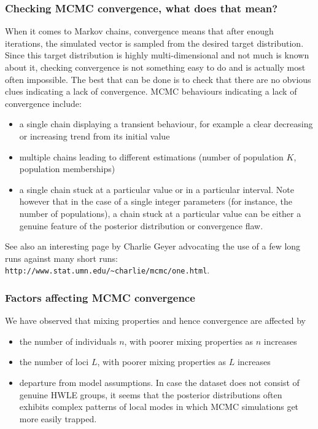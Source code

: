 \documentclass[a4paper,10pt]{article}
\begin{document}
\subsubsection{Checking MCMC convergence, what does that mean?}

When it comes to Markov chains, convergence means that after enough iterations, the simulated vector is sampled from the 
desired target distribution. 
Since this target distribution is highly multi-dimensional and not much is known about it, checking convergence is not something easy to do 
and is actually most often impossible. 
The best that can be done is to check that there are no obvious clues indicating a lack of convergence. 
MCMC behaviours indicating a lack of convergence include:

\begin{itemize}
\item a single chain displaying a transient behaviour, for example a clear decreasing or increasing trend from its initial value 
\item multiple chains leading to different estimations (number of population $K$, population memberships)
\item a single chain stuck at a particular value or in a particular interval. Note however that in the case of a single integer parameters 
(for instance, the number of populations), a chain stuck at a particular value can be either a genuine feature of the posterior distribution 
or convergence flaw.
\end{itemize} 


See also an interesting page by Charlie Geyer advocating the use of a few long runs against many short runs:
\texttt{http://www.stat.umn.edu/\~{ }charlie/mcmc/one.html}.

\subsubsection{Factors affecting MCMC convergence}\label{sec:fact_MCMC_conv}

We have observed that mixing properties and hence convergence are affected by 

\begin{itemize}
\item the number of individuals $n$,  with poorer mixing properties as $n$ increases 
\item the number of loci $L$, with poorer mixing properties as $L$ increases 
\item departure from model assumptions. In case the dataset does not consist of genuine HWLE groups, it seems 
that the posterior distributions often exhibits  complex patterns of local modes in which MCMC simulations 
get more easily trapped. 
\end{itemize} 
\end{document}
